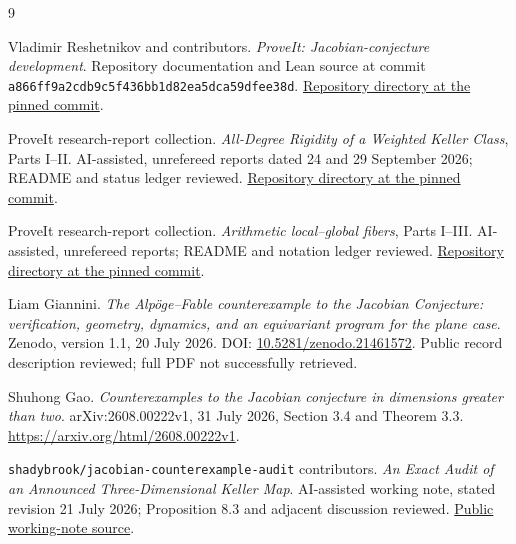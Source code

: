 \documentclass[11pt,a4paper]{article}
\numberwithin{equation}{section}
\theoremstyle{definition}
\theoremstyle{remark}
\begin{document}
\begin{thebibliography}{9}

Vladimir Reshetnikov and contributors.
\emph{ProveIt: Jacobian-conjecture development}.
Repository documentation and Lean source at commit
\texttt{a866ff9a2cdb9c5f436bb1d82ea5dca59dfee38d}.
\href{https://github.com/VladimirReshetnikov/ProveIt/tree/a866ff9a2cdb9c5f436bb1d82ea5dca59dfee38d/Algebra/JacobianConjecture}{Repository directory at the pinned commit}.

ProveIt research-report collection.
\emph{All-Degree Rigidity of a Weighted Keller Class}, Parts I--II.
AI-assisted, unrefereed reports dated 24 and 29 September 2026;
README and status ledger reviewed.
\href{https://github.com/VladimirReshetnikov/ProveIt/tree/a866ff9a2cdb9c5f436bb1d82ea5dca59dfee38d/SetTheory/Cardinals/docs/reports/jacobian-conjecture/weighted-keller-rigidity}{Repository directory at the pinned commit}.

ProveIt research-report collection.
\emph{Arithmetic local--global fibers}, Parts I--III.
AI-assisted, unrefereed reports; README and notation ledger reviewed.
\href{https://github.com/VladimirReshetnikov/ProveIt/tree/a866ff9a2cdb9c5f436bb1d82ea5dca59dfee38d/SetTheory/Cardinals/docs/reports/jacobian-conjecture/arithmetic-local-global-fibers}{Repository directory at the pinned commit}.

Liam Giannini.
\emph{The Alp\"oge--Fable counterexample to the Jacobian Conjecture:
verification, geometry, dynamics, and an equivariant program for
the plane case}.
Zenodo, version 1.1, 20 July 2026.
DOI: \href{https://doi.org/10.5281/zenodo.21461572}{10.5281/zenodo.21461572}.
Public record description reviewed; full PDF not successfully retrieved.

Shuhong Gao.
\emph{Counterexamples to the Jacobian conjecture in dimensions
greater than two}.
arXiv:2608.00222v1, 31 July 2026, Section 3.4 and Theorem 3.3.
\url{https://arxiv.org/html/2608.00222v1}.

\texttt{shadybrook/jacobian-counterexample-audit} contributors.
\emph{An Exact Audit of an Announced Three-Dimensional Keller Map}.
AI-assisted working note, stated revision 21 July 2026;
Proposition 8.3 and adjacent discussion reviewed.
\href{https://github.com/shadybrook/jacobian-counterexample-audit/blob/main/paper/main.md}{Public working-note source}.

\end{thebibliography}
\end{document}
